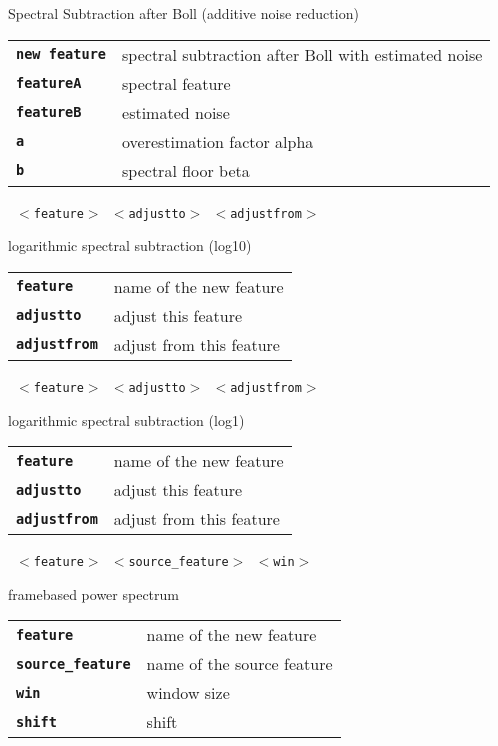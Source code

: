 \begin{description}
\begin{description}
        Spectral Subtraction after Boll (additive noise reduction)

      \begin{tabular}{ll}
 \texttt{\textbf{new feature}} &  spectral subtraction after Boll with estimated noise \\
 \texttt{\textbf{featureA}} &     spectral feature \\
 \texttt{\textbf{featureB}} &     estimated noise \\
 \texttt{\textbf{a}} &             overestimation factor alpha  \\
 \texttt{\textbf{b}} &             spectral floor beta  \\
      \end{tabular}
       \texttt{ $<$feature$>$ $<$adjustto$>$ $<$adjustfrom$>$} \

        logarithmic spectral subtraction (log10)

      \begin{tabular}{ll}
 \texttt{\textbf{feature}} &     name of the new feature \\
 \texttt{\textbf{adjustto}} &    adjust this feature \\
 \texttt{\textbf{adjustfrom}} &  adjust from this feature \\
      \end{tabular}
       \texttt{ $<$feature$>$ $<$adjustto$>$ $<$adjustfrom$>$} \

        logarithmic spectral subtraction (log1)

      \begin{tabular}{ll}
 \texttt{\textbf{feature}} &     name of the new feature \\
 \texttt{\textbf{adjustto}} &    adjust this feature \\
 \texttt{\textbf{adjustfrom}} &  adjust from this feature \\
      \end{tabular}
       \texttt{ $<$feature$>$ $<$source\_feature$>$ $<$win$>$ } \

        framebased power spectrum

      \begin{tabular}{ll}
 \texttt{\textbf{feature}} &         name of the new feature \\
 \texttt{\textbf{source\_feature}} &  name of the source feature \\
 \texttt{\textbf{win}} &             window size  \\
 \texttt{\textbf{shift}} &            shift  \\
      \end{tabular}
       \texttt{} \


\end{description}
\end{description}
